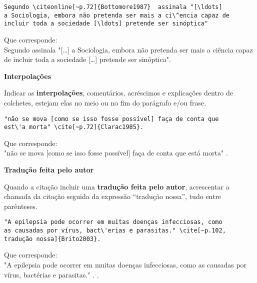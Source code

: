 \begin{alineas}
\begin{verbatim}
Segundo \citeonline[~p.72]{Bottomore1987}  assinala "[\ldots]  
a Sociologia, embora não pretenda ser mais a ci\^encia capaz de 
incluir toda a sociedade [\ldots] pretende ser sinóptica"
\end{verbatim}

Que corresponde:\\

Segundo   assinala "[\ldots]  a Sociologia, embora não pretenda ser mais a ci\^encia capaz de incluir toda a sociedade [\ldots] pretende ser sinóptica".\\ 

\item

\textbf{Interpolações}

Indicar as \textbf{interpolações}, coment\'arios, acr\'escimos e explicações dentro de colchetes, estejam elas no meio ou no fim do par\'agrafo e/ou frase.

\begin{verbatim}
"não se mova [como se isso fosse possível] faça de conta que 
est\'a morta" \cite[~p.72]{Clarac1985}.
\end{verbatim}

Que corresponde:\\

"não se mova [como se isso fosse possível] faça de conta que 
est\'a morta" \cite[~p.72]{Clarac1985}. \\

\item

\textbf{Tradução feita pelo autor}

Quando a citação incluir uma \textbf{tradução feita pelo autor}, acrescentar a chamada da citação seguida da expressão “tradução nossa”, tudo entre par\^enteses.

\begin{verbatim}
"A epilepsia pode ocorrer em muitas doenças infecciosas, como 
as causadas por vírus, bact\'erias e parasitas." \cite[~p.102,
tradução nossa]{Brito2003}.
\end{verbatim}

Que corresponde:\\

"A epilepsia pode ocorrer em muitas doenças infecciosas, como 
as causadas por vírus, bact\'erias e parasitas." . \cite[~p.102, tradução nossa]{Brito2003}.\\
\end{alineas}

